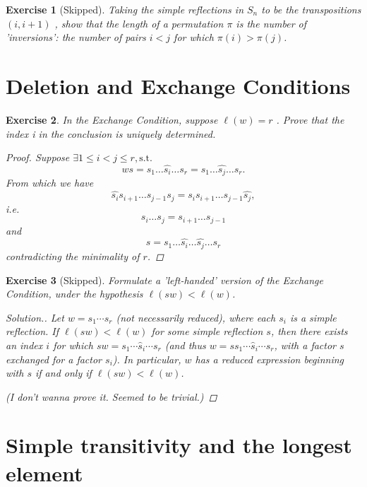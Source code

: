 \documentclass{article}
\theoremstyle{breakstyle}
\newtheorem{exercise}{Exercise}[section]
\newenvironment{solution}
  {\begin{proof}[Solution.]\renewcommand{\qedsymbol}{}}
  {\end{proof}}
\begin{document}
\begin{exercise}[Skipped]
Taking the simple reflections in $S_{n}$ to be the transpositions $(i, i + 1)$ ,
show that the length of a permutation $\pi$ is the number of 'inversions': the
number of pairs $i < j$ for which $\pi(i) > \pi(j)$.
\end{exercise}

\section{Deletion and Exchange Conditions}

\begin{exercise}
In the Exchange Condition, suppose $\ell(w)=r$ . Prove that the index i in the
conclusion is uniquely determined.

\begin{proof}
    Suppose $\exists 1\le i<j\le r,\text{s.t. }$
    $$
    ws=s_1\ldots \hat{s_{i}}\ldots s_{r}=s_1\ldots \hat{s_{j}}\ldots s_{r}
    .$$
    From which we have
    $$
    \hat{s_{i}}s_{i+1}\ldots s_{j-1}s_{j}=s_{i}s_{i+1}\ldots s_{j-1}\hat{s_{j}}
    ,$$
    i.e.
    $$
    s_{i}\ldots s_{j}=s_{i+1}\ldots s_{j-1}
    $$
    and
    $$
    s=s_1\ldots \hat{s_{i}}\ldots \hat{s_{j}}\ldots s_{r}
    $$
    contradicting the minimality of $r$.
\end{proof}

\end{exercise}

\begin{exercise}[Skipped]
Formulate a 'left-handed' version of the Exchange Condition, under the
hypothesis $\ell(sw) < \ell(w)$.

\begin{solution}
Let $w = s_1 \cdots s_r$ (not necessarily reduced), where each $s_i$ is a simple
reflection. If $\ell(sw) < \ell(w)$ for some simple reflection $s$, then there
exists an index $i$ for which $sw = s_1 \cdots \hat{s}_i \cdots s_r$ (and thus
$w = s s_1 \cdots \hat{s}_i \cdots s_r$, with a factor $s$ exchanged for a
factor $s_i$). In particular, $w$ has a reduced expression beginning with $s$ if
and only if $\ell(sw) < \ell(w)$.

\emph{(I don't wanna prove it. Seemed to be trivial.)}
\end{solution}

\end{exercise}

\section{Simple transitivity and the longest element}
\end{document}
